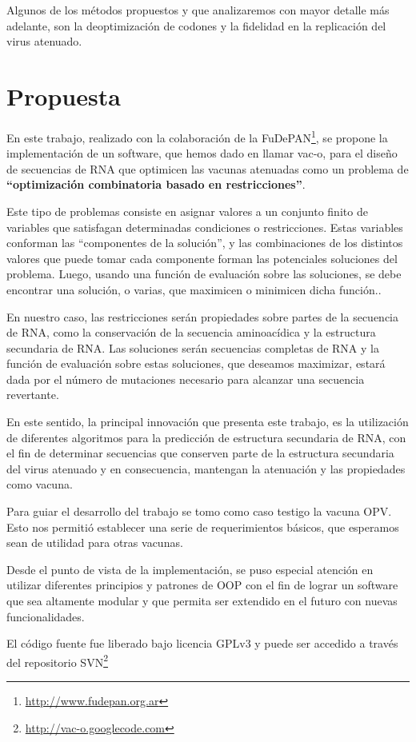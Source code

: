 Algunos de los m\'etodos propuestos y que analizaremos con mayor detalle m\'as
adelante, son la deoptimizaci\'on  de codones\cite{Coleman08} y la fidelidad en
la replicaci\'on del virus atenuado\cite{Vignuzzi08}.

\section{Propuesta}
\label{propuesta}
En este trabajo, realizado con la colaboraci\'on de la
\ac{FuDePAN}\footnote{\url{http://www.fudepan.org.ar}}, se propone la
implementaci\'on de un software, que hemos dado en llamar \ac{vac-o}, para el
dise\~no de secuencias de \ac{RNA} que optimicen las vacunas atenuadas como un
problema de \textbf{``optimizaci\'on combinatoria basado en restricciones''}. 

Este tipo de problemas consiste en asignar valores a un conjunto finito de
variables que satisfagan determinadas condiciones o restricciones. Estas
variables conforman las ``componentes de la soluci\'on'', y las combinaciones de
los distintos valores que puede tomar cada componente forman las potenciales
soluciones del problema. Luego, usando una funci\'on de evaluaci\'on sobre las
soluciones, se debe encontrar una soluci\'on, o varias, que maximicen o
minimicen dicha funci\'on.\cite{Hoos04}.

En nuestro caso, las restricciones ser\'an propiedades sobre partes de la
secuencia de \ac{RNA}, como la conservaci\'on de la secuencia aminoac\'idica y
la estructura secundaria de \ac{RNA}. Las soluciones ser\'an secuencias
completas de \ac{RNA} y la funci\'on de evaluaci\'on sobre estas soluciones, que
deseamos maximizar, estar\'a dada por el n\'umero de mutaciones necesario para
alcanzar una secuencia revertante.

En este sentido, la principal innovaci\'on que presenta este trabajo, es la
utilizaci\'on de diferentes algoritmos para la predicci\'on de estructura
secundaria de \ac{RNA}, con el fin de determinar secuencias que conserven parte
de la estructura secundaria del virus atenuado y en consecuencia, mantengan la
atenuaci\'on y las propiedades como vacuna.

Para guiar el desarrollo del trabajo se tomo como caso testigo la vacuna
\ac{OPV}. Esto nos permiti\'o establecer una serie de requerimientos b\'asicos,
que esperamos sean de utilidad para otras vacunas.

Desde el punto de vista de la implementaci\'on, se puso especial atenci\'on en
utilizar diferentes principios y patrones de \ac{OOP} con
el fin de lograr un software que sea altamente modular y que permita ser
extendido en el futuro con nuevas funcionalidades.

El c\'odigo fuente fue liberado bajo licencia \ac{GPLv3} y puede ser accedido a
trav\'es del repositorio \ac{SVN}\footnote{\url{http://vac-o.googlecode.com}}